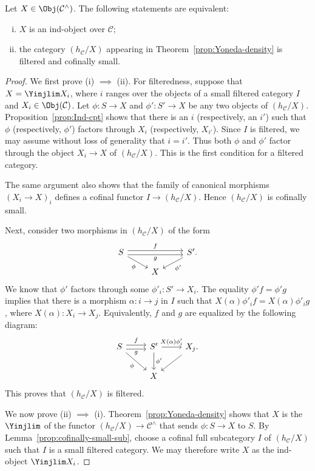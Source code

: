 \begin{proposition}\label{prop:recognize-ind}
	Let $X\in\Obj(\mathcal{C}^\wedge)$. The following statements are equivalent:
	\begin{enumerate}[(i)]
		\item $X$ is an ind-object over $\mathcal{C}$;
		\item the category $(h_{\mathcal{C}}/X)$ appearing in Theorem~\ref{prop:Yoneda-density} is filtered and cofinally small.
	\end{enumerate}
\end{proposition}
\begin{proof}
	We first prove (i) $\implies$ (ii). For filteredness, suppose that $X=\Yinjlim X_i$, where $i$ ranges over the objects of a small filtered category $I$ and $X_i\in\Obj(\mathcal{C})$. Let $\phi:S\to X$ and $\phi':S'\to X$ be any two objects of $(h_{\mathcal{C}}/X)$. Proposition~\ref{prop:Ind-cpt} shows that there is an $i$ (respectively, an $i'$) such that $\phi$ (respectively, $\phi'$) factors through $X_i$ (respectively, $X_{i'}$). Since $I$ is filtered, we may assume without loss of generality that $i=i'$. Thus both $\phi$ and $\phi'$ factor through the object $X_i\to X$ of $(h_{\mathcal{C}}/X)$. This is the first condition for a filtered category.

	The same argument also shows that the family of canonical morphisms $(X_i\to X)_i$ defines a cofinal functor $I\to(h_{\mathcal{C}}/X)$. Hence $(h_{\mathcal{C}}/X)$ is cofinally small.

	Next, consider two morphisms in $(h_{\mathcal{C}}/X)$ of the form
	\[\begin{tikzcd}[row sep=small]
		S \arrow[rr, shift left, "f"] \arrow[rr, shift right, "g"'] \arrow[rd, "\phi"'] & & S' . \arrow[ld, "{\phi'}"] \\
		& X &
	\end{tikzcd}\]
	We know that $\phi'$ factors through some $\phi'_i:S'\to X_i$. The equality $\phi'f=\phi'g$ implies that there is a morphism $\alpha:i\to j$ in $I$ such that $X(\alpha)\phi'_if=X(\alpha)\phi'_ig$, where $X(\alpha):X_i\to X_j$. Equivalently, $f$ and $g$ are equalized by the following diagram:
	\[\begin{tikzcd}
		S \arrow[r, shift left, "f"] \arrow[r, shift right, "g"'] \arrow[rd, "\phi"'] & S' \arrow[d, "{\phi'}"] \arrow[r, "{X(\alpha) \phi'_i}"] & X_j . \arrow[ld] \\
		& X &
	\end{tikzcd}\]
	This proves that $(h_{\mathcal{C}}/X)$ is filtered.

	We now prove (ii) $\implies$ (i). Theorem~\ref{prop:Yoneda-density} shows that $X$ is the $\Yinjlim$ of the functor $(h_{\mathcal{C}}/X)\to\mathcal{C}^\wedge$ that sends $\phi:S\to X$ to $S$. By Lemma~\ref{prop:cofinally-small-sub}, choose a cofinal full subcategory $I$ of $(h_{\mathcal{C}}/X)$ such that $I$ is a small filtered category. We may therefore write $X$ as the ind-object $\Yinjlim X_i$.
\end{proof}


